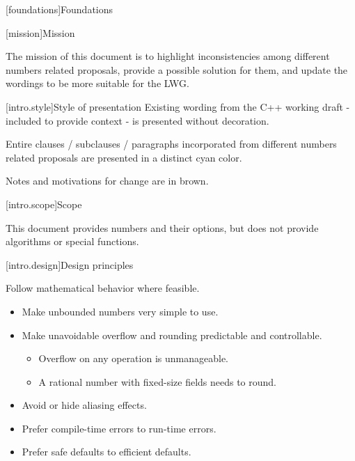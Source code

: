 
[foundations]{Foundations}

[mission]{Mission}

\iffalse %
The mission of this specification is to make numbers easier to use.
\else
The mission of this document is to highlight inconsistencies among different numbers related proposals, provide a possible solution for them, and update the wordings to be more suitable for the LWG.
\fi

[intro.style]{Style of presentation}
Existing wording from the C++ working draft - included to provide context - is presented without decoration.

\begin{addedblock}
Entire clauses / subclauses / paragraphs incorporated from different numbers related proposals are presented in a distinct cyan
color.
\end{addedblock}




\begin{modifcommentblock}
Notes and motivations for change are in brown.
\end{modifcommentblock}

[intro.scope]{Scope}

This document provides numbers and their options, but does not provide algorithms or special functions.

[intro.design]{Design principles}

Follow mathematical behavior where feasible.

\begin{itemize}
\item Make unbounded numbers very simple to use.
\item Make unavoidable overflow and rounding predictable and controllable.
\begin{itemize}
\item Overflow on any operation is unmanageable.
\item A rational number with fixed-size fields needs to round.
\end{itemize}
\item Avoid or hide aliasing effects.
\item Prefer compile-time errors to run-time errors.
\item Prefer safe defaults to efficient defaults.
\end{itemize}

